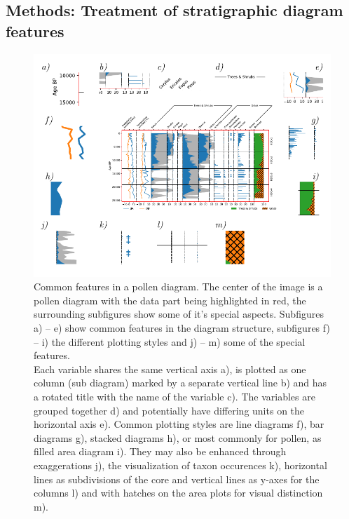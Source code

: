 \begin{refsection}
\section{Methods: Treatment of stratigraphic diagram features}  \label{sec:straditize-methods}

\begin{figure}
	\includegraphics[width=\linewidth]{straditize-figures/sample-diagram-explained.pdf}
	\caption[Common features in a pollen diagram]{Common features in a pollen diagram. The center of the image is a pollen diagram with the data part being highlighted in red, the surrounding subfigures show some of it’s special aspects.
		Subfigures a) – e) show common features in the diagram structure, subfigures f) – i) the different plotting styles and j) – m) some of the special features. \\
		Each variable shares the same vertical axis a), is plotted as one column (sub diagram) marked by a separate vertical line b) and has a rotated title with the name of the variable c). The variables are grouped together d) and potentially have differing units on the horizontal axis  e). Common plotting styles are line diagrams f), bar diagrams g), stacked diagrams h), or  most commonly for pollen, as filled area diagram i). They may also be enhanced through exaggerations j), the visualization of taxon occurences k), horizontal lines as subdivisions of the core and vertical lines as y-axes for the columns l)  and with hatches on the area plots     for visual distinction m).
	}
	\label{fig:sample-diagram}
\end{figure}


\end{refsection}
